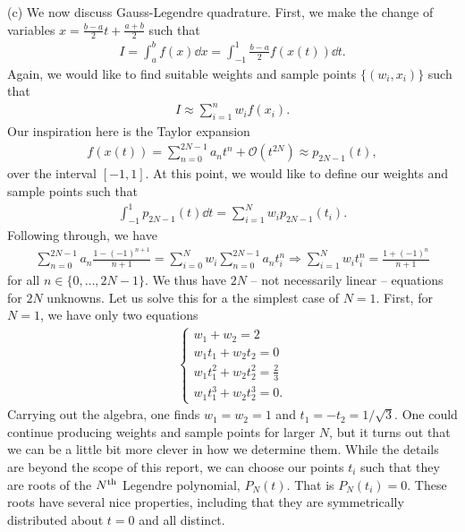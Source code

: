 {(c) We now discuss Gauss-Legendre quadrature.
First, we make the change of variables $x = \frac{b-a}{2} t + \frac{a+b}{2}$ such that
\begin{align}
    I = \int_{a}^{b} f(x) \dd{x} = \int_{-1}^{1} \frac{b-a}{2} f(x(t)) \dd{t}
.\end{align}
Again, we would like to find suitable weights and sample points $\{ (w_{i},x_{i}) \}$ such that
\begin{align}
    I \approx \sum_{i=1}^{n} w_{i} f(x_{i})
.\end{align}
Our inspiration here is the Taylor expansion
\begin{align}
    f(x(t)) = \sum_{n=0}^{2N-1} a_{n} t^{n} + \mathcal{O}(t^{2N}) \approx p_{2N-1}(t)
,\end{align}
over the interval $[-1,1]$.
At this point, we would like to define our weights and sample points such that 
\begin{align}
    \int_{-1}^{1} p_{2N-1}(t) \dd{t} = \sum_{i=1}^{N} w_{i} p_{2N-1}(t_{i})
.\end{align}
Following through, we have
\begin{gather}
    \sum_{n=0}^{2N-1} a_{n} \frac{1 - (-1)^{n+1}}{n+1} = \sum_{i=0}^{N} w_{i} \sum_{n=0}^{2N-1} a_{n} t_{i}^{n} \Rightarrow
    \sum_{i=1}^{N} w_{i} t_{i}^{n} = \frac{1 + (-1)^{n}}{n+1}
\end{gather}
for all $n \in \{0,\ldots,2N-1\}$.
We thus have $2N$ -- not necessarily linear -- equations for $2N$ unknowns.
Let us solve this for a the simplest case of $N = 1$.
First, for $N = 1$, we have only two equations
\begin{align}
    \begin{cases}
        w_1 + w_2 = 2 \\
        w_1 t_1 + w_2 t_2 = 0 \\
        \displaystyle w_1 t_1^2 + w_2 t_2^2 = \frac{2}{3} \\
        w_1 t_1^3 + w_2 t_2^3 = 0
    .\end{cases}
\end{align}
Carrying out the algebra, one finds $w_{1} = w_{2} = 1$ and $t_{1} = -t_{2} = 1/\sqrt{3}$.
One could continue producing weights and sample points for larger $N$, but it turns out that we can be a little bit more clever in how we determine them.
While the details are beyond the scope of this report, we can choose our points $t_{i}$ such that they are roots of the $N^{\rm th}$ Legendre polynomial, $P_{N}(t)$.
That is $P_{N}(t_{i}) = 0$.
These roots have several nice properties, including that they are symmetrically distributed about $t = 0$ and all distinct.
}
